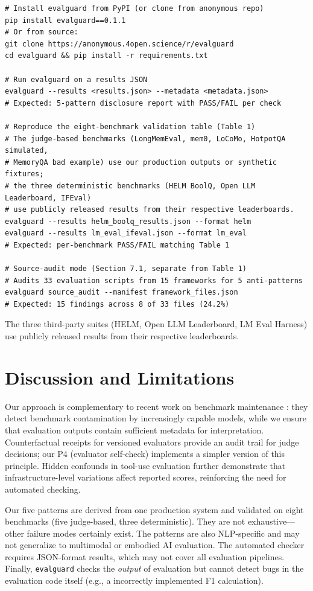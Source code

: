 \documentclass[11pt]{article}
\begin{document}
\begin{verbatim}
# Install evalguard from PyPI (or clone from anonymous repo)
pip install evalguard==0.1.1
# Or from source:
git clone https://anonymous.4open.science/r/evalguard
cd evalguard && pip install -r requirements.txt

# Run evalguard on a results JSON
evalguard --results <results.json> --metadata <metadata.json>
# Expected: 5-pattern disclosure report with PASS/FAIL per check

# Reproduce the eight-benchmark validation table (Table 1)
# The judge-based benchmarks (LongMemEval, mem0, LoCoMo, HotpotQA simulated,
# MemoryQA bad example) use our production outputs or synthetic fixtures;
# the three deterministic benchmarks (HELM BoolQ, Open LLM Leaderboard, IFEval)
# use publicly released results from their respective leaderboards.
evalguard --results helm_boolq_results.json --format helm
evalguard --results lm_eval_ifeval.json --format lm_eval
# Expected: per-benchmark PASS/FAIL matching Table 1

# Source-audit mode (Section 7.1, separate from Table 1)
# Audits 33 evaluation scripts from 15 frameworks for 5 anti-patterns
evalguard source_audit --manifest framework_files.json
# Expected: 15 findings across 8 of 33 files (24.2%)
\end{verbatim}

The three third-party suites (HELM, Open LLM Leaderboard, LM Eval Harness) use publicly released results from their respective leaderboards.
\section{Discussion and Limitations}

Our approach is complementary to recent work on benchmark maintenance \citep{unearned2026}: they detect benchmark contamination by increasingly capable models, while we ensure that evaluation outputs contain sufficient metadata for interpretation. Counterfactual receipts for versioned evaluators \citep{receipts2026} provide an audit trail for judge decisions; our P4 (evaluator self-check) implements a simpler version of this principle. Hidden confounds in tool-use evaluation \citep{hiddenconfounds2026} further demonstrate that infrastructure-level variations affect reported scores, reinforcing the need for automated checking.

Our five patterns are derived from one production system and validated on eight benchmarks (five judge-based, three deterministic). They are not exhaustive---other failure modes certainly exist. The patterns are also NLP-specific and may not generalize to multimodal or embodied AI evaluation. The automated checker requires JSON-format results, which may not cover all evaluation pipelines. Finally, \texttt{evalguard} checks the \emph{output} of evaluation but cannot detect bugs in the evaluation code itself (e.g., a incorrectly implemented F1 calculation).
\end{document}
